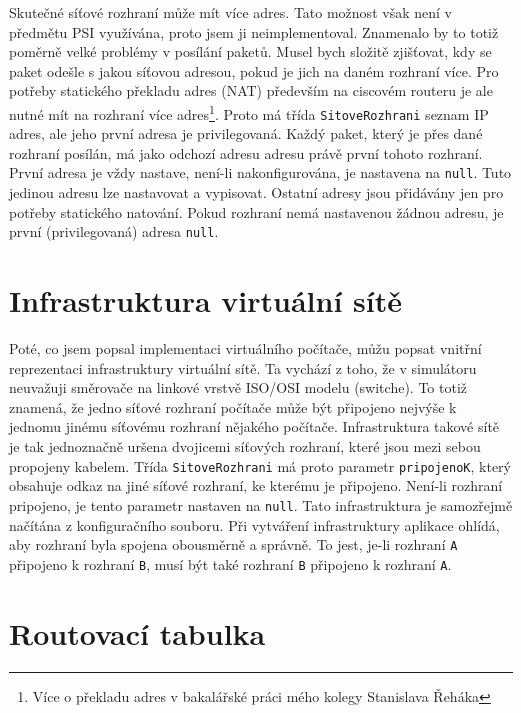 Skutečné síťové rozhraní může mít více adres. Tato možnost však není v předmětu PSI využívána, proto jsem ji neimplementoval. Znamenalo by to totiž poměrně velké problémy v posílání paketů. Musel bych složitě zjišťovat, kdy se paket odešle s jakou síťovou adresou, pokud je jich na daném rozhraní více. Pro potřeby statického překladu adres (NAT) především na ciscovém routeru je ale nutné mít na rozhraní více adres\footnote{Více o překladu adres v bakalářské práci mého kolegy Stanislava Řeháka}. Proto má třída \verb|SitoveRozhrani| seznam IP adres, ale jeho první adresa je privilegovaná. Každý paket, který je přes dané rozhraní posílán, má jako odchozí adresu adresu právě první tohoto rozhraní. První adresa je vždy nastave, není-li nakonfigurována, je nastavena na \verb|null|. Tuto jedinou adresu lze nastavovat a vypisovat. Ostatní adresy jsou přidávány jen pro potřeby statického natování. Pokud rozhraní nemá nastavenou žádnou adresu, je první (privilegovaná) adresa \verb|null|.




\section{Infrastruktura virtuální sítě}\label{ifrastruktura_site}

Poté, co jsem popsal implementaci virtuálního počítače, můžu popsat vnitřní reprezentaci infrastruktury virtuální sítě. Ta vychází z toho, že v simulátoru neuvažuji směrovače na linkové vrstvě ISO/OSI modelu (switche). To totiž znamená, že jedno síťové rozhraní počítače může být připojeno nejvýše k jednomu jinému síťovému rozhraní nějakého počítače. Infrastruktura takové sítě je tak jednoznačně uršena dvojicemi síťových rozhraní, které jsou mezi sebou propojeny kabelem. Třída \verb|SitoveRozhrani| má proto parametr \verb|pripojenoK|, který obsahuje odkaz na jiné síťové rozhraní, ke kterému je připojeno. Není-li rozhraní pripojeno, je tento parametr nastaven na \verb|null|. Tato infrastruktura je samozřejmě načítána z konfiguračního souboru. Při vytváření infrastruktury aplikace ohlídá, aby rozhraní byla spojena obousměrně a správně. To jest, je-li rozhraní \verb|A| připojeno k rozhraní \verb|B|, musí být také rozhraní \verb|B| připojeno k rozhraní \verb|A|.




\section{Routovací tabulka}

